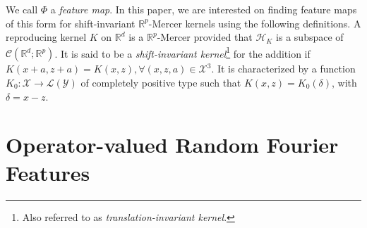 \documentclass[twocolumn]{article}
\begin{document}
We call $\Phi$ a \emph{feature map}. In this paper, we are interested on
finding feature maps of this form for shift-invariant $\mathbb{R}^p$-Mercer
kernels using the following definitions.  A reproducing kernel $K$ on
$\mathbb{R}^d$ is a $\mathbb{R}^p$-Mercer provided that $\mathcal{H}_K$ is a
subspace of $\mathcal{C}(\mathbb{R}^d;\mathbb{R}^p)$. It is said to be a
\emph{shift-invariant kernel}\footnote{Also referred to as
\emph{translation-invariant kernel}.} for the addition if $ K(x+a,z+a)=K(x,z),
\forall (x,z,a) \in \mathcal{X}^3$. It is characterized by a function
$K_0:\mathcal{X} \to \mathcal{L}(\mathcal{Y})$ of completely positive type such
that $K(x,z)=K_0(\delta)$, with $\delta=x-z$.
\section{Operator-valued Random Fourier Features}
\label{sec:orff}
\end{document}

